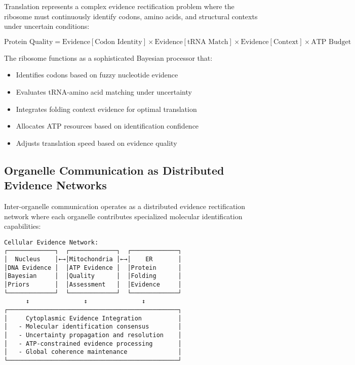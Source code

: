 \documentclass[12pt,a4paper]{article}
\begin{document}
Translation represents a complex evidence rectification problem where the ribosome must continuously identify codons, amino acids, and structural contexts under uncertain conditions:

\begin{equation}
\text{Protein Quality} = \text{Evidence}[\text{Codon Identity}] \times \text{Evidence}[\text{tRNA Match}] \times \text{Evidence}[\text{Context}] \times \text{ATP Budget}
\end{equation}

The ribosome functions as a sophisticated Bayesian processor that:
\begin{itemize}
\item Identifies codons based on fuzzy nucleotide evidence
\item Evaluates tRNA-amino acid matching under uncertainty
\item Integrates folding context evidence for optimal translation
\item Allocates ATP resources based on identification confidence
\item Adjusts translation speed based on evidence quality
\end{itemize}

\subsection{Organelle Communication as Distributed Evidence Networks}

Inter-organelle communication operates as a distributed evidence rectification network where each organelle contributes specialized molecular identification capabilities:

\begin{verbatim}
Cellular Evidence Network:
┌─────────────┐  ┌─────────────┐  ┌─────────────┐
│  Nucleus    │←→│Mitochondria │←→│    ER       │
│DNA Evidence │  │ATP Evidence │  │Protein      │
│Bayesian     │  │Quality      │  │Folding      │
│Priors       │  │Assessment   │  │Evidence     │
└─────────────┘  └─────────────┘  └─────────────┘
      ↕               ↕               ↕
┌───────────────────────────────────────────────┐
│     Cytoplasmic Evidence Integration          │
│   - Molecular identification consensus        │
│   - Uncertainty propagation and resolution    │
│   - ATP-constrained evidence processing       │
│   - Global coherence maintenance              │
└───────────────────────────────────────────────┘
\end{verbatim}
\end{document}
